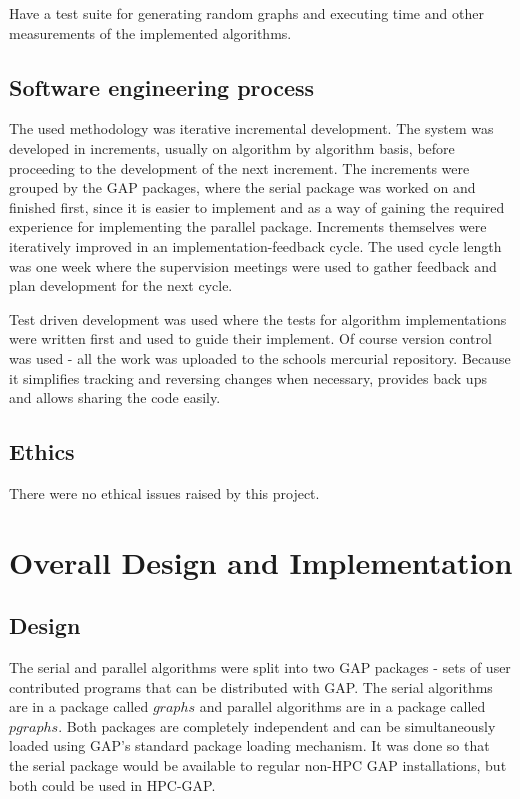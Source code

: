 \documentclass{report}
\theoremstyle{plain}
\theoremstyle{definition}
\theoremstyle{remark}
\begin{document}
Have a test suite for generating random graphs and executing time and other measurements of the implemented algorithms.

\section{Software engineering process}
 
The used methodology was iterative incremental development. The system was developed in increments, usually on algorithm by algorithm basis, before proceeding to the development of the next increment. The increments were grouped by the GAP packages, where the serial package was worked on and finished first, since it is easier to implement and as a way of gaining the required experience for implementing the parallel package. Increments themselves were iteratively improved in an implementation-feedback cycle. The used cycle length was one week where the supervision meetings were used to gather feedback and plan development for the next cycle.

Test driven development was used where the tests for algorithm implementations were written first and used to guide their implement. Of course version control was used - all the work was uploaded to the schools mercurial repository. Because it simplifies tracking and reversing changes when necessary, provides back ups and allows sharing the code easily.

\section{Ethics}

There were no ethical issues raised by this project.

\chapter{Overall Design and Implementation}

\section{Design}

The serial and parallel algorithms were split into two GAP packages - sets of user contributed programs that can be distributed with GAP. The serial algorithms are in a package called $graphs$ and parallel algorithms are in a package called $pgraphs$. Both packages are completely independent and can be simultaneously loaded using GAP's standard package loading mechanism. It was done so that the serial package would be available to regular non-HPC GAP installations, but both could be used in HPC-GAP.
\end{document}
